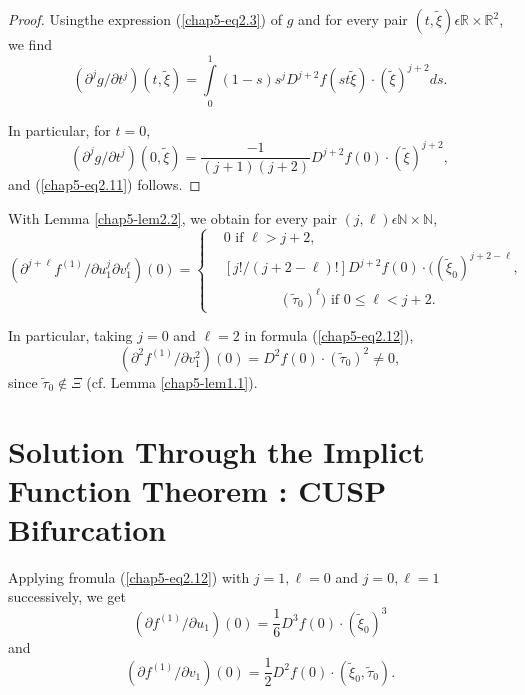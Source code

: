 \begin{proof}
Using\pageoriginale the expression (\ref{chap5-eq2.3}) of $g$ and for
every pair $(t, \widetilde{\xi}) \epsilon \mathbb{R} \times
\mathbb{R}^{2}$, we find
$$
(\partial^{j} g / \partial t^{j}) (t, \widetilde{\xi}) =
\int\limits_{0}^{1} (1-s)s^{j}D^{j+2}f(st \widetilde{\xi}) \cdot
(\widetilde{\xi})^{j+2} ds.
$$

In particular, for $t = 0$,
$$
(\partial^{j} g/\partial t^{j})(0, \widetilde{\xi}) =
\frac{-1}{(j+1)(j+2)} D^{j+2} f(0) \cdot (\widetilde{\xi})^{j+2},
$$
and (\ref{chap5-eq2.11}) follows.
\end{proof}

With Lemma \ref{chap5-lem2.2}, we obtain for every pair $(j, \ell)
\epsilon \mathbb{N} \times \mathbb{N}$,
\begin{equation*}
(\partial^{j+\ell} f^{(1)} / \partial u_{1}^{j} \partial v_{1}^{\ell})
  (0) = 
\begin{cases}
& 0 \text{ if } \ell > j+2,\\
& [j!/(j+2-\ell)!] D^{j+2} f(0) \cdot
  ((\widetilde{\xi}_{0})^{j+2-\ell},\\ 
&\qquad\qquad (\widetilde{\tau}_{0})^{\ell})
  \text{ if } 0 \leq \ell < j+2.
\end{cases}\tag{2.12}\label{chap5-eq2.12}
\end{equation*}

In particular, taking $j = 0$ and $\ell = 2$ in formula
(\ref{chap5-eq2.12}), 
\begin{equation*}
(\partial^{2}f^{(1)} / \partial v_{1}^{2})(0) = D^{2}f(0) \cdot
  (\widetilde{\tau}_{0})^{2} \neq 0,\tag{2.13}\label{chap5-eq2.13}
\end{equation*}
since $\widetilde{\tau}_{0} \notin \Xi$ (cf. Lemma
\ref{chap5-lem1.1}).

\section[Solution Through the Implict Function....]{Solution Through the Implict Function Theorem : CUSP
  Bifurcation}\label{chap5-sec3}

Applying fromula (\ref{chap5-eq2.12}) with $j = 1, \ell = 0$ and $j =
0, \ell = 1$ successively, we get
\begin{equation*}
(\partial f^{(1)}/ \partial u_{1})(0) = \frac{1}{6} D^{3}f(0)\cdot (\widetilde{\xi}_{0})^{3}\tag{3.1}\label{chap5-eq3.1}
\end{equation*}
and 
$$
(\partial f^{(1)}/ \partial v_{1})(0) = \frac{1}{2} D^{2}f(0) \cdot
(\widetilde{\xi}_{0}, \widetilde{\tau}_{0}).
$$

